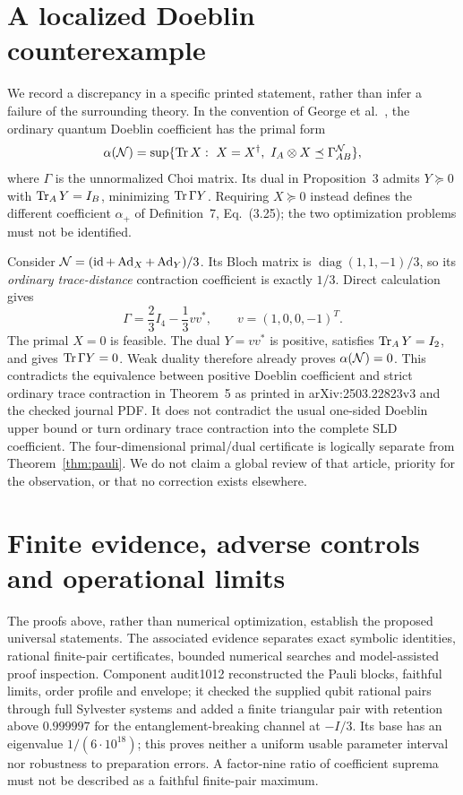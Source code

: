 \section{A localized Doeblin counterexample}\label{sec:doeblin}
We record a discrepancy in a specific printed statement, rather than infer a failure of the surrounding theory. In the convention of George et al.~\cite[Definition~4, Eq.~(3.1)]{Doeblin}, the ordinary quantum Doeblin coefficient has the primal form
\[
 \alpha(\mathcal N)=\sup\{\operatorname{Tr} X:\ X=X^\dagger,\ I_A\otimes X\preceq\Gamma_{AB}^{\mathcal N}\},
\]
where \(\Gamma\) is the unnormalized Choi matrix. Its dual in Proposition~3 admits \(Y\succeq0\) with \(\operatorname{Tr}_A Y=I_B\), minimizing \(\operatorname{Tr}\Gamma Y\). Requiring \(X\succeq0\) instead defines the different coefficient \(\alpha_+\) of Definition~7, Eq.~(3.25); the two optimization problems must not be identified.

Consider \(\mathcal N=(\operatorname{id}+\operatorname{Ad}_X+\operatorname{Ad}_Y)/3\). Its Bloch matrix is \(\operatorname{diag}(1,1,-1)/3\), so its \emph{ordinary trace-distance} contraction coefficient is exactly \(1/3\). Direct calculation gives
\[
 \Gamma=\frac23I_4-\frac13vv^*,\qquad v=(1,0,0,-1)^T.
\]
The primal \(X=0\) is feasible. The dual \(Y=vv^*\) is positive, satisfies \(\operatorname{Tr}_A Y=I_2\), and gives \(\operatorname{Tr}\Gamma Y=0\). Weak duality therefore already proves \(\alpha(\mathcal N)=0\).
This contradicts the equivalence between positive Doeblin coefficient and strict ordinary trace contraction in Theorem~5 as printed in arXiv:2503.22823v3 and the checked journal PDF. It does not contradict the usual one-sided Doeblin upper bound or turn ordinary trace contraction into the complete SLD coefficient. The four-dimensional primal/dual certificate is logically separate from Theorem~\ref{thm:pauli}. We do not claim a global review of that article, priority for the observation, or that no correction exists elsewhere.

\section{Finite evidence, adverse controls and operational limits}\label{sec:limits}
The proofs above, rather than numerical optimization, establish the proposed universal statements. The associated evidence separates exact symbolic identities, rational finite-pair certificates, bounded numerical searches and model-assisted proof inspection.
Component audit1012 reconstructed the Pauli blocks, faithful limits, order profile and envelope; it checked the supplied qubit rational pairs through full Sylvester systems and added a finite triangular pair with retention above \(0.999997\) for the entanglement-breaking channel at \(-I/3\). Its base has an eigenvalue \(1/(6\cdot10^{18})\); this proves neither a uniform usable parameter interval nor robustness to preparation errors. A factor-nine ratio of coefficient suprema must not be described as a faithful finite-pair maximum.

